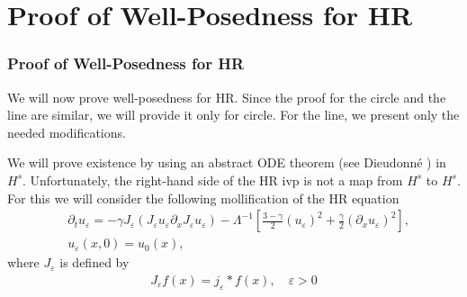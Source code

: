 \documentclass{beamer}
\newcommand{\p}{\partial}
\newcommand{\ee}{\varepsilon}
\begin{document}
\section{Proof of Well-Posedness for HR}
\begin{frame}[allowframebreaks]
	\frametitle{Proof of Well-Posedness for HR}

%
%
%
%
%
We will now prove well-posedness for HR.
Since the proof for the circle and the line are similar,
we will provide it only for circle.
For the line, we present only the
needed modifications.
%
%
%
%
%

We will prove existence by using an abstract ODE theorem (see Dieudonn\'e 
\cite{Dieudonne_1969_Foundations-of-}) in $H^s$. 
Unfortunately, the 
right-hand side of the HR ivp is not a map from $H^s$ to $H^s$.
For this we will consider the following mollification of the HR equation
%
%
\begin{align*}
& \p_t  u_\ee =
-\gamma J_\ee(J_\ee u_\ee \partial_x  J_\ee  u_\ee) - \Lambda^{-1} \left 
[\frac{3-\gamma}{2}(u_\ee)^2 + \frac{\gamma}{2}(\p_x u_\ee)^2 \right ],
\\
& u_\ee(x, 0) = u_0 (x),
\label{hr-moli-data}
\end{align*}
%
% 
%
%
%
%
%
%
where $J_\ee$ is defined  by
%
\begin{equation*}
\begin{split}
J_\ee f(x) = j_\ee * f(x), \quad \ee>0
\end{split}
\end{equation*}
%
\end{frame}
\end{document}

